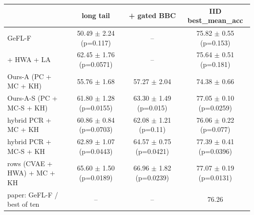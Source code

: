\begin{tabular}{lccc}
\toprule
 & long tail & + gated BBC & IID best_mean_acc \\
\midrule
GeFL-F & 50.49 $\pm$ 2.24 (p=0.117) & -- & 75.82 $\pm$ 0.55 (p=0.153) \\
+ HWA + LA & 62.45 $\pm$ 1.76 (p=0.0571) & -- & 75.64 $\pm$ 0.51 (p=0.181) \\
Ours-A (PC + MC + KH) & 55.76 $\pm$ 1.68 & 57.27 $\pm$ 2.04 & 74.38 $\pm$ 0.66 \\
Ours-A-S (PC + MC-S + KH) & 61.80 $\pm$ 1.28 (p=0.0155) & 63.30 $\pm$ 1.49 (p=0.015) & 77.05 $\pm$ 0.10 (p=0.0259) \\
hybrid PCR + MC + KH & 60.86 $\pm$ 0.84 (p=0.0703) & 62.08 $\pm$ 1.21 (p=0.11) & 76.06 $\pm$ 0.22 (p=0.077) \\
hybrid PCR + MC-S + KH & 62.89 $\pm$ 1.07 (p=0.0443) & 64.57 $\pm$ 0.75 (p=0.0421) & 77.39 $\pm$ 0.41 (p=0.0396) \\
rows (CVAE + HWA) + MC + KH & 65.60 $\pm$ 1.50 (p=0.0189) & 66.96 $\pm$ 1.82 (p=0.0239) & 77.07 $\pm$ 0.19 (p=0.0131) \\
paper: GeFL-F / best of ten & -- & -- & 76.26 \\
\bottomrule
\end{tabular}
